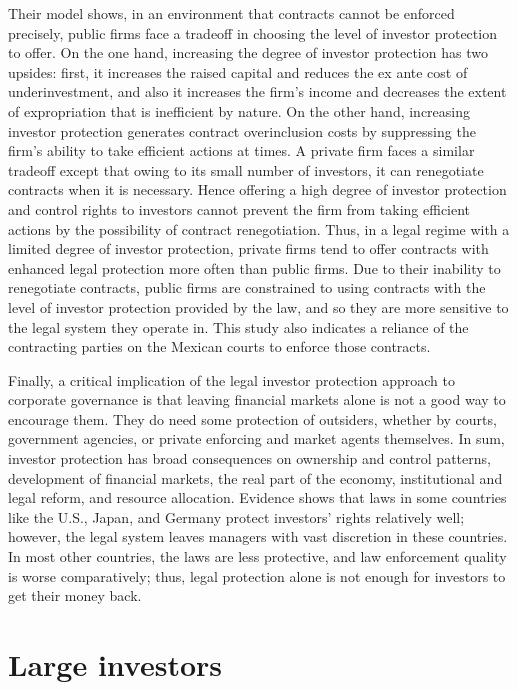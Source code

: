 \documentclass[final,1p,authoryear]{elsarticle}
\begin{document}
Their model shows, in an environment that contracts cannot be enforced precisely, public firms face a tradeoff in choosing the level of investor protection to offer. On the one hand, increasing the degree of investor protection has two upsides: first, it increases the raised capital and reduces the ex ante cost of underinvestment, and also it increases the firm’s income and decreases the extent of expropriation that is inefficient by nature. On the other hand, increasing investor protection generates contract overinclusion costs by suppressing the firm’s ability to take efficient actions at times. A private firm faces a similar tradeoff except that owing to its small number of investors, it can renegotiate contracts when it is necessary. Hence offering a high degree of investor protection and control rights to investors cannot prevent the firm from taking efficient actions by the possibility of contract renegotiation. Thus, in a legal regime with a limited degree of investor protection, private firms tend to offer contracts with enhanced legal protection more often than public firms. Due to their inability to renegotiate contracts, public firms are constrained to using contracts with the level of investor protection provided by the law, and so they are more sensitive to the legal system they operate in. This study also indicates a reliance of the contracting parties on the Mexican courts to enforce those contracts.

Finally, a critical implication of the legal investor protection approach to corporate governance is that leaving financial markets alone is not a good way to encourage them. They do need some protection of outsiders, whether by courts, government agencies, or private enforcing and market agents themselves. In sum, investor protection has broad consequences on ownership and control patterns, development of financial markets, the real part of the economy, institutional and legal reform, and resource allocation. Evidence shows that laws in some countries like the U.S., Japan, and Germany protect investors' rights relatively well; however, the legal system leaves managers with vast discretion in these countries. In most other countries, the laws are less protective, and law enforcement quality is worse comparatively; thus, legal protection alone is not enough for investors to get their money back.


\section{Large investors}
\end{document}
